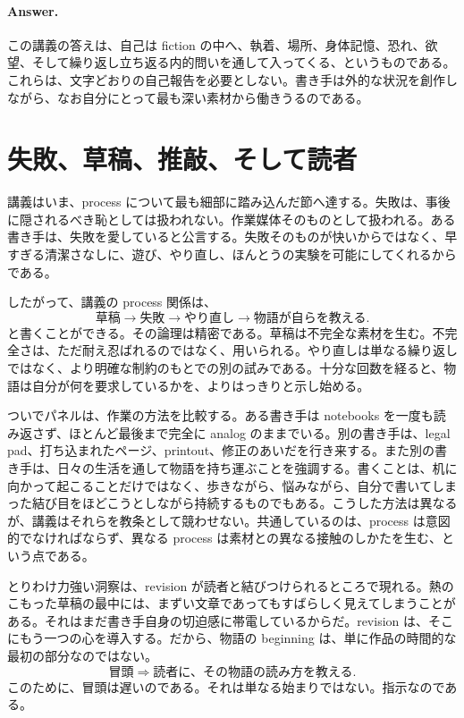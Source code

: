 \paragraph{Answer.} この講義の答えは、自己は fiction の中へ、執着、場所、身体記憶、恐れ、欲望、そして繰り返し立ち返る内的問いを通して入ってくる、というものである。これらは、文字どおりの自己報告を必要としない。書き手は外的な状況を創作しながら、なお自分にとって最も深い素材から働きうるのである。

\section{失敗、草稿、推敲、そして読者}

講義はいま、process について最も細部に踏み込んだ節へ達する。失敗は、事後に隠されるべき恥としては扱われない。作業媒体そのものとして扱われる。ある書き手は、失敗を愛していると公言する。失敗そのものが快いからではなく、早すぎる清潔さなしに、遊び、やり直し、ほんとうの実験を可能にしてくれるからである。

したがって、講義の process 関係は、
\begin{equation}
\text{草稿} \to \text{失敗} \to \text{やり直し} \to \text{物語が自らを教える}.
\end{equation}
と書くことができる。その論理は精密である。草稿は不完全な素材を生む。不完全さは、ただ耐え忍ばれるのではなく、用いられる。やり直しは単なる繰り返しではなく、より明確な制約のもとでの別の試みである。十分な回数を経ると、物語は自分が何を要求しているかを、よりはっきりと示し始める。

ついでパネルは、作業の方法を比較する。ある書き手は notebooks を一度も読み返さず、ほとんど最後まで完全に analog のままでいる。別の書き手は、legal pad、打ち込まれたページ、printout、修正のあいだを行き来する。また別の書き手は、日々の生活を通して物語を持ち運ぶことを強調する。書くことは、机に向かって起こることだけではなく、歩きながら、悩みながら、自分で書いてしまった結び目をほどこうとしながら持続するものでもある。こうした方法は異なるが、講義はそれらを教条として競わせない。共通しているのは、process は意図的でなければならず、異なる process は素材との異なる接触のしかたを生む、という点である。

とりわけ力強い洞察は、revision が読者と結びつけられるところで現れる。熱のこもった草稿の最中には、まずい文章であってもすばらしく見えてしまうことがある。それはまだ書き手自身の切迫感に帯電しているからだ。revision は、そこにもう一つの心を導入する。だから、物語の beginning は、単に作品の時間的な最初の部分なのではない。
\begin{equation}
\text{冒頭} \Rightarrow \text{読者に、その物語の読み方を教える}.
\end{equation}
このために、冒頭は遅いのである。それは単なる始まりではない。指示なのである。

